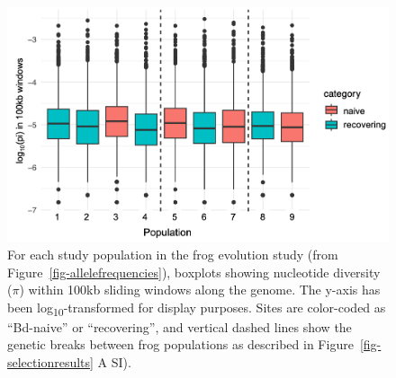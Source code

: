 \documentclass[
  letterpaper,
  DIV=11,
  numbers=noendperiod]{scrartcl}
\begin{document}
\newpage

\begin{figure}

{\centering \includegraphics[width=5.72917in,height=\textheight]{figures/boxplot_genomewide_pi_by_pop.png}

}

\caption{\label{fig-boxplot-genomewide-pi-by-pop}For each study
population in the frog evolution study (from
Figure~\ref{fig-allelefrequencies}), boxplots showing nucleotide
diversity (\(\pi\)) within 100kb sliding windows along the genome. The
y-axis has been log\textsubscript{10}-transformed for display purposes.
Sites are color-coded as ``Bd-naive'' or ``recovering'', and vertical
dashed lines show the genetic breaks between frog populations as
described in Figure~\ref{fig-selectionresults} A SI).}

\end{figure}

\newpage
\end{document}
